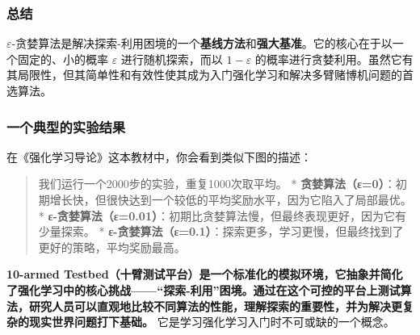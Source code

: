 \documentclass[11pt]{ctexart}
\begin{document}
\hypertarget{ux603bux7ed3}{%
\subsubsection{总结}\label{ux603bux7ed3}}

\(\varepsilon\)-贪婪算法是解决探索-利用困境的一个\textbf{基线方法}和\textbf{强大基准}。它的核心在于以一个固定的、小的概率
\(\varepsilon\) 进行随机探索，而以 \(1-\varepsilon\)
的概率进行贪婪利用。虽然它有其局限性，但其简单性和有效性使其成为入门强化学习和解决多臂赌博机问题的首选算法。

    \hypertarget{ux4e00ux4e2aux5178ux578bux7684ux5b9eux9a8cux7ed3ux679c}{%
\subsubsection{一个典型的实验结果}\label{ux4e00ux4e2aux5178ux578bux7684ux5b9eux9a8cux7ed3ux679c}}

在《强化学习导论》这本教材中，你会看到类似下图的描述：

\begin{quote}
我们运行一个2000步的实验，重复1000次取平均。 *
\textbf{贪婪算法（ε=0）}：初期增长快，但很快达到一个较低的平均奖励水平，因为它陷入了局部最优。
*
\textbf{ε-贪婪算法（ε=0.01）}：初期比贪婪算法慢，但最终表现更好，因为它有少量探索。
*
\textbf{ε-贪婪算法（ε=0.1）}：探索更多，学习更慢，但最终找到了更好的策略，平均奖励最高。
\end{quote}

\textbf{10-armed
Testbed（十臂测试平台）是一个标准化的模拟环境，它抽象并简化了强化学习中的核心挑战------``探索-利用''困境。通过在这个可控的平台上测试算法，研究人员可以直观地比较不同算法的性能，理解探索的重要性，并为解决更复杂的现实世界问题打下基础。}
它是学习强化学习入门时不可或缺的一个概念。
\end{document}
